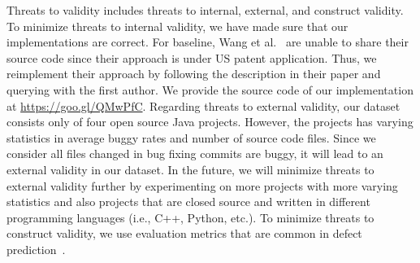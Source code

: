 Threats to validity includes threats to internal, external, and construct validity. To minimize threats to internal validity, we have made sure that our implementations are correct. 
For baseline, Wang et al.~\cite{wang2016automatically} are unable to share their source code since their approach is under US patent application. Thus, we reimplement their approach by following the description in their paper and querying with the first author. We provide the source code of our implementation at \url{https://goo.gl/QMwPfC}. 
Regarding threats to external validity, our dataset consists only of four open source Java projects. However, the projects has varying statistics in average buggy rates and number of source code files. Since we consider all files changed in bug fixing commits are buggy, it will lead to an external validity in our dataset. In the future, we will minimize threats to external validity further by experimenting on more projects with more varying statistics and also projects that are closed source and written in different programming languages (i.e., C++, Python, etc.). To minimize threats to construct validity, we use evaluation metrics that are common in defect prediction~\cite{nam2013transfer}.
